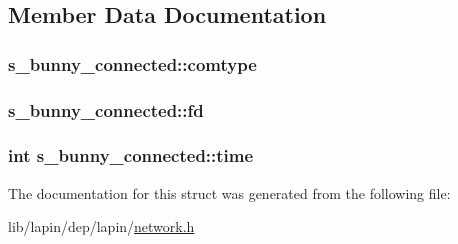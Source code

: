 \subsection{Member Data Documentation}
\hypertarget{structs__bunny__connected_a10429ece6d8cca149992d92ee3a5684d}{
\subsubsection[{comtype}]{ s\-\_\-bunny\-\_\-connected\-::comtype}}\label{structs__bunny__connected_a10429ece6d8cca149992d92ee3a5684d}
\hypertarget{structs__bunny__connected_a7a9cb31b03a175341ac351004544d76b}{
\subsubsection[{fd}]{ s\-\_\-bunny\-\_\-connected\-::fd}}\label{structs__bunny__connected_a7a9cb31b03a175341ac351004544d76b}
\hypertarget{structs__bunny__connected_a10083f6f6c89f528e8343c7f461d84d1}{
\subsubsection[{time}]{ {\bf int} s\-\_\-bunny\-\_\-connected\-::time}}\label{structs__bunny__connected_a10083f6f6c89f528e8343c7f461d84d1}


The documentation for this struct was generated from the following file\-:\begin{DoxyCompactItemize}
\item 
lib/lapin/dep/lapin/\hyperlink{network_8h}{network.\-h}\end{DoxyCompactItemize}
